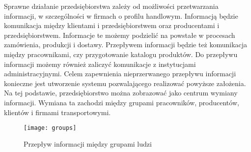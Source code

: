 \par Sprawne działanie przedsiębiorstwa zależy od możliwości przetwarzania informacji, w szczególności w firmach o profilu handlowym. Informacją będzie komunikacja między klientami i przedsiębiorstwem oraz producentami i przedsiębiorstwem. Informacje te możemy podzielić na powstałe w procesach zamówienia, produkcji i dostawy. Przepływem informacji będzie też komunikacja między pracownikami, czy przygotowanie katalogu produktów. Do przepływu informacji możemy również zaliczyć komunikacje z instytucjami administracyjnymi. Celem zapewnienia nieprzerwanego przepływu informacji konieczne jest utworzenie systemu pozwalającego realizować powyższe założenia. Na tej podstawie, przedsiębiorstwo można zobrazować jako centrum wymiany informacji. Wymiana ta zachodzi między grupami pracowników, producentów, klientów i firmami transportowymi.
		
		\begin{figure}[H]
			\centering
			\texttt{[image: groups]}
			\caption{Przepływ informacji między grupami ludzi}
			\label{groups}
		\end{figure} 
